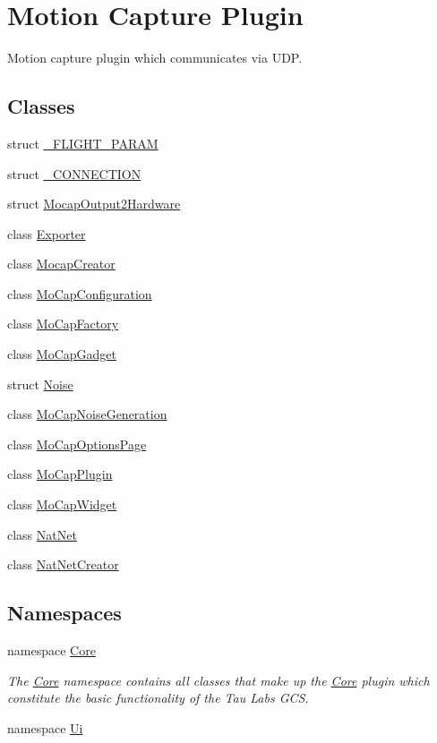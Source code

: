 \hypertarget{group___mo_cap_plugin}{\section{\-Motion \-Capture \-Plugin}
\label{group___mo_cap_plugin}
}


\-Motion capture plugin which communicates via \-U\-D\-P.  


\subsection*{\-Classes}
\begin{DoxyCompactItemize}
\item 
struct \hyperlink{struct___f_l_i_g_h_t___p_a_r_a_m}{\-\_\-\-F\-L\-I\-G\-H\-T\-\_\-\-P\-A\-R\-A\-M}
\item 
struct \hyperlink{struct___c_o_n_n_e_c_t_i_o_n}{\-\_\-\-C\-O\-N\-N\-E\-C\-T\-I\-O\-N}
\item 
struct \hyperlink{struct_mocap_output2_hardware}{\-Mocap\-Output2\-Hardware}
\item 
class \hyperlink{class_exporter}{\-Exporter}
\item 
class \hyperlink{class_mocap_creator}{\-Mocap\-Creator}
\item 
class \hyperlink{class_mo_cap_configuration}{\-Mo\-Cap\-Configuration}
\item 
class \hyperlink{class_mo_cap_factory}{\-Mo\-Cap\-Factory}
\item 
class \hyperlink{class_mo_cap_gadget}{\-Mo\-Cap\-Gadget}
\item 
struct \hyperlink{struct_noise}{\-Noise}
\item 
class \hyperlink{class_mo_cap_noise_generation}{\-Mo\-Cap\-Noise\-Generation}
\item 
class \hyperlink{class_mo_cap_options_page}{\-Mo\-Cap\-Options\-Page}
\item 
class \hyperlink{class_mo_cap_plugin}{\-Mo\-Cap\-Plugin}
\item 
class \hyperlink{class_mo_cap_widget}{\-Mo\-Cap\-Widget}
\item 
class \hyperlink{class_nat_net}{\-Nat\-Net}
\item 
class \hyperlink{class_nat_net_creator}{\-Nat\-Net\-Creator}
\end{DoxyCompactItemize}
\subsection*{\-Namespaces}
\begin{DoxyCompactItemize}
\item 
namespace \hyperlink{namespace_core}{\-Core}
\begin{DoxyCompactList}\small\item\em \-The \hyperlink{namespace_core}{\-Core} namespace contains all classes that make up the \hyperlink{namespace_core}{\-Core} plugin which constitute the basic functionality of the \-Tau \-Labs \-G\-C\-S. \end{DoxyCompactList}\item 
namespace \hyperlink{namespace_ui}{\-Ui}
\end{DoxyCompactItemize}
